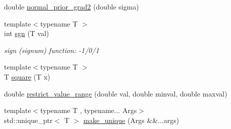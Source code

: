 \begin{DoxyCompactItemize}
\item 
double \hyperlink{namespacemappel_af0854db4bba8cd5c5a782405867ada59}{normal\+\_\+prior\+\_\+grad2} (double sigma)
\item 
{\footnotesize template$<$typename T $>$ }\\int \hyperlink{namespacemappel_a0afb4ee3661d53a85a1091164f27a8fb}{sgn} (T val)
\begin{DoxyCompactList}\small\item\em sign (signum) function\+: -\/1/0/1 \end{DoxyCompactList}\item 
{\footnotesize template$<$typename T $>$ }\\T \hyperlink{namespacemappel_a8475cdb3edacceb0ae215c3ebd1f33c1}{square} (T x)
\item 
double \hyperlink{namespacemappel_a8f4c92d0dd53d394b53df80013d8d730}{restrict\+\_\+value\+\_\+range} (double val, double minval, double maxval)
\item 
{\footnotesize template$<$typename T , typename... Args$>$ }\\std\+::unique\+\_\+ptr$<$ T $>$ \hyperlink{namespacemappel_a965a7374aa364331ed67aae33205aa9c}{make\+\_\+unique} (Args \&\&...args)
\end{DoxyCompactItemize}
